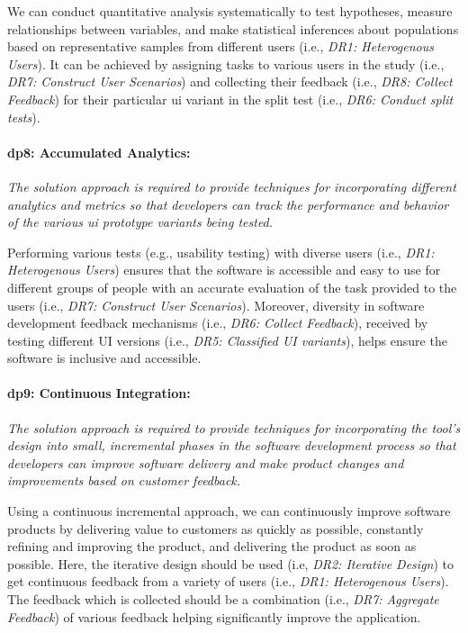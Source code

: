 We can conduct quantitative analysis systematically to test hypotheses, measure relationships between variables, and make statistical inferences about populations based on representative samples from different users (i.e., \textit{DR1: Heterogenous Users}).
It can be achieved by assigning tasks to various users in the study (i.e., \textit{DR7: Construct User Scenarios}) and collecting their feedback (i.e., \textit{DR8: Collect Feedback}) for their particular \ac{ui} variant in the split test (i.e., \textit{DR6: Conduct split tests}).

\paragraph{\ac{dp}8: Accumulated Analytics:} \textit{The solution approach is required to provide techniques for incorporating different analytics and metrics so that developers can track the performance and behavior of the various \ac{ui} prototype variants being tested.}

Performing various tests (e.g., usability testing) with diverse users (i.e., \textit{DR1: Heterogenous Users}) ensures that the software is accessible and easy to use for different groups of people with an accurate evaluation of the task provided to the users (i.e., \textit{DR7: Construct User Scenarios}).
Moreover, diversity in software development feedback mechanisms (i.e., \textit{DR6: Collect Feedback}), received by testing different UI versions (i.e., \textit{DR5: Classified UI variants}), helps ensure the software is inclusive and accessible.

\paragraph{\ac{dp}9: Continuous Integration:} \textit{The solution approach is required to provide techniques for incorporating the tool's design into small, incremental phases in the software development process so that developers can improve software delivery and make product changes and improvements based on customer feedback.}

Using a continuous incremental approach, we can continuously improve software products by delivering value to customers as quickly as possible, constantly refining and improving the product, and delivering the product as soon as possible.
Here, the iterative design should be used (i.e, \textit{DR2: Iterative Design}) to get continuous feedback from a variety of users (i.e., \textit{DR1: Heterogenous Users}).
The feedback which is collected should be a combination (i.e., \textit{DR7: Aggregate Feedback}) of various feedback helping significantly improve the application.

